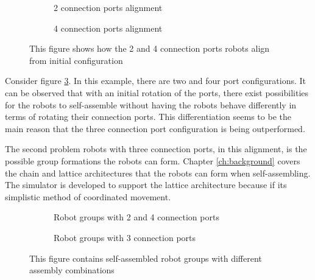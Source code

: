 \begin{figure}[H]
	\begin{subfigure}[t]{0.49\textwidth}
		\centering
		\caption{2 connection ports alignment}
		\label{2-port-guided-allignment}
	\end{subfigure}
	\begin{subfigure}[t]{0.49\textwidth}
		\centering
		\caption{4 connection ports alignment}
		\label{4-port-guided-allignment}
	\end{subfigure}
	\caption{This figure shows how the 2 and 4 connection ports robots align from initial configuration}
	\label{2-4-port-guided-allignment}
\end{figure}

Consider figure \ref{2-4-port-guided-allignment}.
In this example, there are two and four port configurations.
It can be observed that with an initial rotation of the ports, there exist possibilities for the robots to self-assemble without having the robots behave differently in terms of rotating their connection ports.
This differentiation seems to be the main reason that the three connection port configuration is being outperformed.

The second problem robots with three connection ports, in this alignment, is the possible group formations the robots can form.
Chapter \ref{ch:background} covers the chain and lattice architectures that the robots can form when self-assembling. %
The simulator is developed to support the lattice architecture because if its simplistic method of coordinated movement.

\begin{figure}[H]
	\begin{subfigure}[t]{0.49\textwidth}
		\centering
		\caption{Robot groups with 2 and 4 connection ports}
		\label{2-4-port-architecture}
	\end{subfigure}
	\begin{subfigure}[t]{0.49\textwidth}
		\centering
		\caption{Robot groups with 3 connection ports}
		\label{3-port-architecture}
	\end{subfigure}
	\caption{This figure contains self-assembled robot groups with different assembly combinations}
	\label{port-architectures}
\end{figure}

